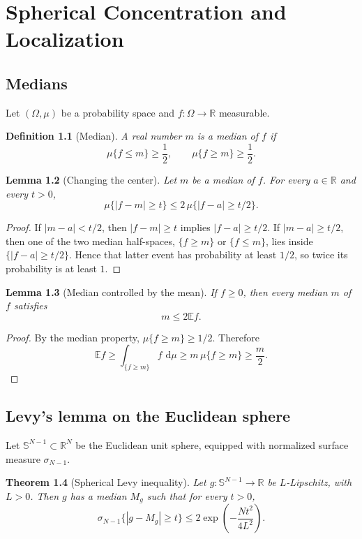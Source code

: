 \documentclass[11pt,oneside]{book}
\newtheorem{theorem}{Theorem}[chapter]
\newtheorem{lemma}[theorem]{Lemma}
\newtheorem{definition}[theorem]{Definition}
\newcommand{\R}{\mathbb R}
\newcommand{\E}{\mathbb E}
\newcommand{\1}{\mathbf 1}
\newcommand{\dd}{\,\mathrm d}
\newcommand{\sphere}{\mathbb S}
\begin{document}
\chapter{Spherical Concentration and Localization}

\section{Medians}

Let \((\Omega,\mu)\) be a probability space and \(f:\Omega\to\R\) measurable.

\begin{definition}[Median]
A real number \(m\) is a median of \(f\) if
\[
  \mu\{f\le m\}\ge\frac12,
  \qquad
  \mu\{f\ge m\}\ge\frac12.
\]
\end{definition}

\begin{lemma}[Changing the center]
Let \(m\) be a median of \(f\).  For every \(a\in\R\) and every \(t>0\),
\[
  \mu\{|f-m|\ge t\}
  \le
  2\,\mu\{|f-a|\ge t/2\}.
\]
\end{lemma}

\begin{proof}
If \(|m-a|<t/2\), then \(|f-m|\ge t\) implies \(|f-a|\ge t/2\).  If
\(|m-a|\ge t/2\), then one of the two median half-spaces,
\(\{f\ge m\}\) or \(\{f\le m\}\), lies inside \(\{|f-a|\ge t/2\}\).  Hence
that latter event has probability at least \(1/2\), so twice its probability
is at least \(1\).
\end{proof}

\begin{lemma}[Median controlled by the mean]
If \(f\ge0\), then every median \(m\) of \(f\) satisfies
\[
  m\le 2\E f.
\]
\end{lemma}

\begin{proof}
By the median property, \(\mu\{f\ge m\}\ge1/2\).  Therefore
\[
  \E f\ge \int_{\{f\ge m\}} f\,\dd\mu
  \ge m\,\mu\{f\ge m\}
  \ge \frac m2.
\]
\end{proof}

\section{Levy's lemma on the Euclidean sphere}

Let \(\sphere^{N-1}\subset\R^N\) be the Euclidean unit sphere, equipped with
normalized surface measure \(\sigma_{N-1}\).

\begin{theorem}[Spherical Levy inequality]
Let \(g:\sphere^{N-1}\to\R\) be \(L\)-Lipschitz, with \(L>0\).  Then \(g\)
has a median \(M_g\) such that for every \(t>0\),
\[
  \sigma_{N-1}\{|g-M_g|\ge t\}
  \le
  2\exp\left(-\frac{Nt^2}{4L^2}\right).
\]
\end{theorem}
\end{document}
